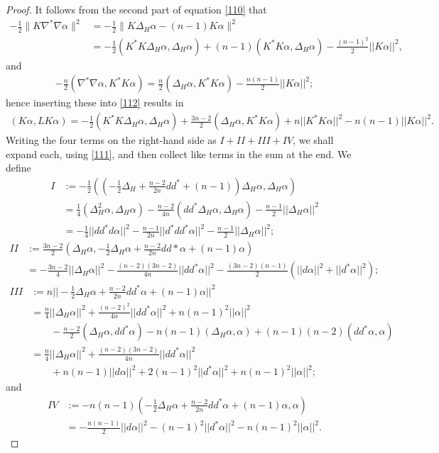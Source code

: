 \documentclass[10pt,a4paper]{amsart}
\begin{document}
\begin{proof}
It follows from the second part of equation \eqref{110} that 
\begin{align*}
-\frac12 \| K \nabla^*\nabla \alpha \|^2  & = -\frac12 \| K \Delta_H \alpha - (n-1) K \alpha \|^2 \\ 
&=-\frac12 (K^*K \Delta_H \alpha, \Delta_H \alpha) + (n-1)  (K^* K \alpha, \Delta_H \alpha) -\frac{(n-1)^2}{2} || K \alpha||^2,
\end{align*}
and
\begin{align*}
-\frac{n}{2}( \nabla^*\nabla \alpha, K^* K\alpha) = \frac{n}{2} ( \Delta_H \alpha, K^* K\alpha) - \frac{n(n-1)}{2} ||K\alpha||^2;
\end{align*}
hence inserting these into \eqref{112} results in
\begin{align*}
 (K \alpha, L K\alpha) =-\frac12 ( K^*K \Delta_H \alpha, \Delta_H \alpha) + \frac{3n-2}{2}( \Delta_H \alpha, K^* K\alpha) + n ||K^*K\alpha||^2 - n(n-1) ||K\alpha||^2.
\end{align*}
Writing the four terms on the right-hand side as $I + II + III + IV$, we shall expand each, using \eqref{111}, and then collect like terms in the sum at the end. We define 
\begin{align*}
I & := -\frac12 (  (-\tfrac12\Delta_H + \frac{n-2}{2n} dd^* + (n-1)) \Delta_H \alpha, \Delta_H \alpha) \\
& = \frac14 (\Delta^2_H \alpha, \Delta_H \alpha) - \frac{n-2}{4n}( dd^* \Delta_H \alpha, \Delta_H \alpha) - \frac{n-1}{2} ||\Delta_H \alpha||^2 \\
& = -\frac{1}{4} ||d d^* d \alpha||^2 - \frac{n-1}{2n} ||d^* d d^*\alpha||^2 - \frac{n-1}{2} ||\Delta_H \alpha||^2; 
\end{align*}
\begin{align*}
II & := \frac{3n-2}{2} (\Delta_H \alpha, -\tfrac12 \Delta_H \alpha + \frac{n-2}{2n} dd*\alpha + (n-1)\alpha) \\
& = -\frac{3n-2}{4}||\Delta_H \alpha||^2 - \frac{(n-2)(3n-2)}{4n} ||dd^* \alpha||^2 - \frac{(3n-2)(n-1)}{2}( ||d\alpha||^2 + ||d^* \alpha||^2);
\end{align*}
\begin{align*}
III & := n || -\tfrac12 \Delta_H \alpha + \frac{n-2}{2n}dd^*\alpha + (n-1)\alpha ||^2 \\
& =  \frac{n}{4} ||\Delta_H \alpha||^2 + \frac{(n-2)^2}{4n} ||dd^* \alpha||^2 + n(n-1)^2 ||\alpha||^2 \\
& \qquad - \frac{n-2}{2} (\Delta_H \alpha, dd^* \alpha) - n(n-1) (\Delta_H \alpha, \alpha) + (n-1)(n-2) (dd^* \alpha, \alpha) \\
& = \frac{n}{4} ||\Delta_H \alpha||^2 + \frac{ (n-2)(3n-2)}{4n} ||dd^*\alpha||^2  \\
& \qquad + n(n-1) ||d\alpha||^2 + 2(n-1)^2 ||d^*\alpha||^2 + n(n-1)^2 ||\alpha||^2;
\end{align*}
and
\begin{align*}
IV &:=  -n(n-1)( -\tfrac12 \Delta_H \alpha + \frac{n-2}{2n} dd^*\alpha + (n-1)\alpha, \alpha)  \\
& = -\frac{n(n-1)}{2} ||d\alpha||^2 - (n-1)^2 ||d^* \alpha||^2 - n(n-1)^2 ||\alpha||^2.
\end{align*}


\end{proof}
\end{document}
